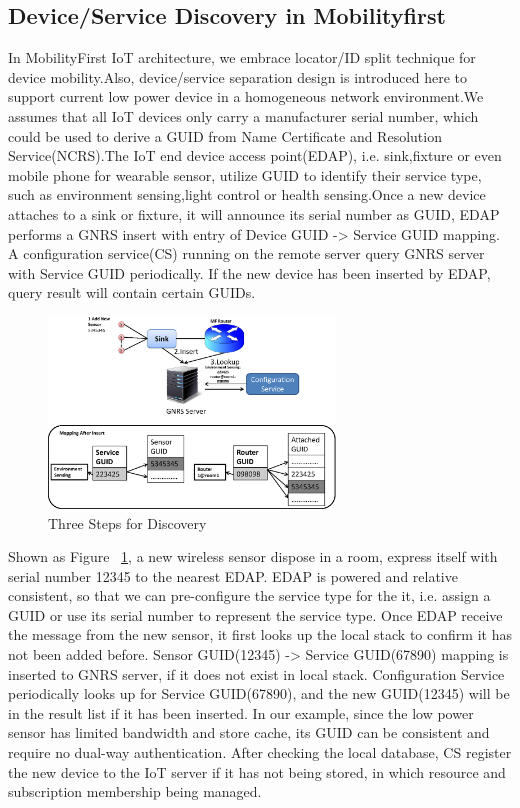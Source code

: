 \subsection{Device/Service Discovery in Mobilityfirst}\label{sec:discoverymf}
In MobilityFirst IoT architecture, we embrace locator/ID split technique for device mobility.Also, device/service separation design is introduced here to support current low power device in a homogeneous network environment.We assumes that all IoT devices only carry a manufacturer serial number, which could be used to derive a GUID from Name Certificate and Resolution Service(NCRS)\cite{}.The IoT end device access point(EDAP), i.e. sink,fixture or even mobile phone for wearable sensor, utilize GUID to identify their service type, such as environment sensing,light control or health sensing.Once a new device attaches to a sink or fixture, it will announce its serial number as GUID, EDAP performs a GNRS insert with entry of Device GUID -> Service GUID mapping. A configuration service(CS) running on the remote server query GNRS server with Service GUID periodically. If the new device has been inserted by EDAP, query result will contain certain GUIDs.
\begin{figure}
\includegraphics[width=3.00in,height=2.00in]{discovery.eps}
\caption{Three Steps for Discovery}
\label{fig:disc}
\end{figure}
Shown as Figure ~\ref{fig:disc}, a new wireless sensor dispose in a room, express itself with serial number 12345 to the nearest EDAP. EDAP is powered and relative consistent, so that we can pre-configure the service type for the it, i.e. assign a GUID or use its serial number to represent the service type. Once EDAP receive the message from the new sensor, it first looks up the local stack to confirm it has not been added before. Sensor GUID(12345) -> Service GUID(67890) mapping is inserted to GNRS server, if it does not exist in local stack. Configuration Service periodically looks up for  Service GUID(67890), and the new GUID(12345) will be  in the result list if it has been inserted. In our example, since the low power sensor has limited bandwidth and store cache, its GUID can be consistent and require no dual-way authentication. After checking the local database, CS register the new device to the IoT server if it has not being stored, in which resource and subscription membership being managed.

          

